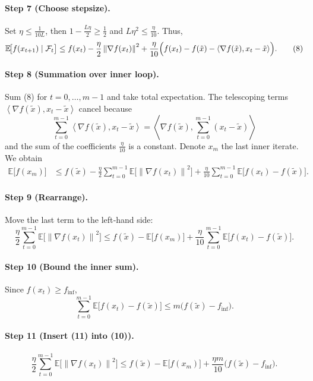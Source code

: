 \documentclass[11pt]{article}
\newcommand{\E}{\mathbb{E}}
\newcommand{\norm}[1]{\left\|#1\right\|}
\newcommand{\inner}[2]{\left\langle #1,#2 \right\rangle}
\begin{document}
\paragraph{Step 7 (Choose stepsize).}
Set $\eta\le\frac{1}{10L}$, then $1-\frac{L\eta}{2}\ge \frac{1}{2}$ and $L\eta^{2}\le\frac{\eta}{10}$. Thus,
\[
\E\!\bigl[f(x_{t+1})\mid\mathcal{F}_t\bigr]
\le f(x_t)-\frac{\eta}{2}\norm{\nabla f(x_t)}^{2}
+\frac{\eta}{10}\Bigl(f(x_t)-f(\tilde{x})-\inner{\nabla f(\tilde{x})}{x_t-\tilde{x}}\Bigr).
\tag{8}
\]

\paragraph{Step 8 (Summation over inner loop).}
Sum (8) for $t=0,\dots,m-1$ and take total expectation.  
The telescoping terms $\inner{\nabla f(\tilde{x})}{x_t-\tilde{x}}$ cancel because
\[
\sum_{t=0}^{m-1}\inner{\nabla f(\tilde{x})}{x_t-\tilde{x}}
= \inner{\nabla f(\tilde{x})}{\sum_{t=0}^{m-1}(x_t-\tilde{x})}
\]
and the sum of the coefficients $\frac{\eta}{10}$ is a constant. Denote $x_m$ the last inner iterate.
We obtain
\[
\begin{aligned}
\E\!\bigl[f(x_m)\bigr]
&\le f(\tilde{x})
-\frac{\eta}{2}\sum_{t=0}^{m-1}\E\!\bigl[\norm{\nabla f(x_t)}^{2}\bigr]
+\frac{\eta}{10}\sum_{t=0}^{m-1}\E\!\bigl[f(x_t)-f(\tilde{x})\bigr].
\end{aligned}
\tag{9}
\]

\paragraph{Step 9 (Rearrange).}
Move the last term to the left‑hand side:
\[
\frac{\eta}{2}\sum_{t=0}^{m-1}\E\!\bigl[\norm{\nabla f(x_t)}^{2}\bigr]
\le f(\tilde{x})- \E\!\bigl[f(x_m)\bigr]
+\frac{\eta}{10}\sum_{t=0}^{m-1}\E\!\bigl[f(x_t)-f(\tilde{x})\bigr].
\tag{10}
\]

\paragraph{Step 10 (Bound the inner sum).}
Since $f(x_t)\ge f_{\inf}$,
\[
\sum_{t=0}^{m-1}\E\!\bigl[f(x_t)-f(\tilde{x})\bigr]
\le m\bigl(f(\tilde{x})-f_{\inf}\bigr).
\tag{11}
\]

\paragraph{Step 11 (Insert (11) into (10)).}
\[
\frac{\eta}{2}\sum_{t=0}^{m-1}\E\!\bigl[\norm{\nabla f(x_t)}^{2}\bigr]
\le f(\tilde{x})- \E\!\bigl[f(x_m)\bigr]
+\frac{\eta m}{10}\bigl(f(\tilde{x})-f_{\inf}\bigr).
\tag{12}
\]
\end{document}

